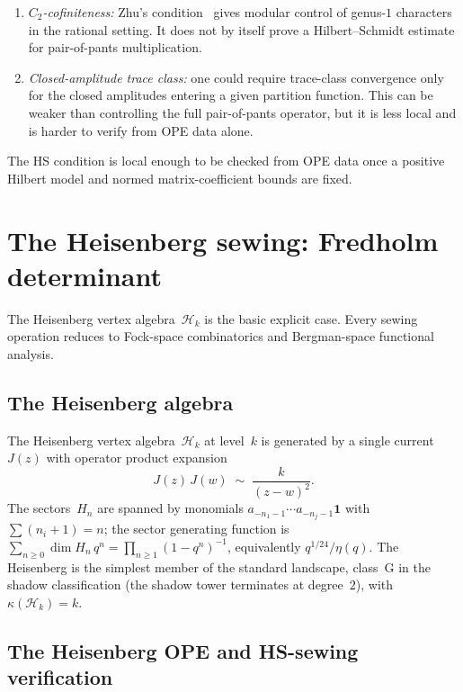\documentclass[11pt,reqno]{amsart}
\theoremstyle{definition}
\theoremstyle{remark}
\newcommand{\cH}{\mathcal{H}}
\numberwithin{equation}{section}
\begin{document}
\begin{enumerate}[label=\textup{(\alph*)}]
\item \emph{$C_2$-cofiniteness:} Zhu's condition~\cite{Zhu96}
 gives modular control of genus-$1$ characters in the rational
 setting. It does not by itself prove a Hilbert--Schmidt estimate
 for pair-of-pants multiplication.
\item \emph{Closed-amplitude trace class:} one could require
 trace-class convergence only for the closed amplitudes
 entering a given partition function.  This can be weaker than
 controlling the full pair-of-pants operator, but it is less local
 and is harder to verify from OPE data alone.
\end{enumerate}

The HS condition is local enough to be checked from OPE data once a
positive Hilbert model and normed matrix-coefficient bounds are fixed.



\section{The Heisenberg sewing: Fredholm determinant}
\label{sec:heisenberg}

The Heisenberg vertex algebra~$\cH_k$ is the basic explicit case.
Every sewing operation reduces to Fock-space combinatorics and
Bergman-space functional analysis.

\subsection{The Heisenberg algebra}\label{subsec:heisenberg-ope}

The Heisenberg vertex algebra~$\cH_k$ at level~$k$ is
generated by a single current~$J(z)$ with operator product
expansion
\[
J(z)\, J(w)
\;\sim\;
\frac{k}{(z-w)^2}.
\]
The sectors~$H_n$ are spanned by monomials
$a_{-n_1-1}\cdots a_{-n_j-1}\mathbf{1}$ with
$\sum(n_i + 1) = n$; the sector generating function is
$\sum_{n \geq 0} \dim H_n\,q^n
= \prod_{n \geq 1}(1 - q^n)^{-1}$,
equivalently $q^{1/24}/\eta(q)$.  The Heisenberg is
the simplest member of the standard landscape, class~G in the
shadow classification (the shadow tower terminates at
degree~$2$), with $\kappa(\cH_k) = k$.

\subsection{The Heisenberg OPE and HS-sewing
 verification}\label{subsec:heisenberg-hs-verification}
\end{document}

